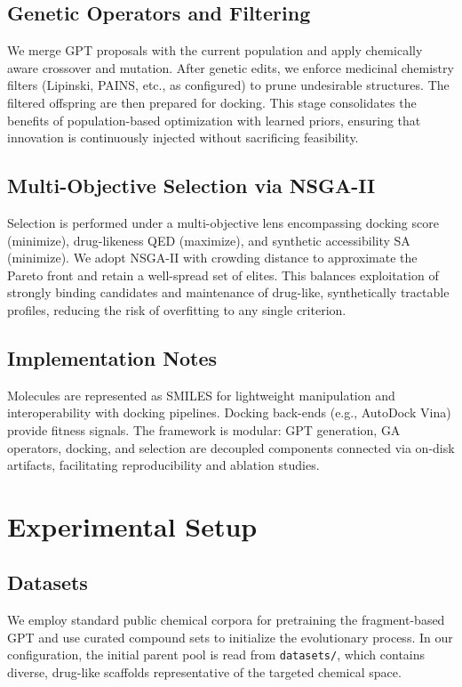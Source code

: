 \documentclass[lettersize,journal]{IEEEtran}
\begin{document}
\subsection{Genetic Operators and Filtering}
We merge GPT proposals with the current population and apply chemically aware crossover and mutation. After genetic edits, we enforce medicinal chemistry filters (Lipinski, PAINS, etc., as configured) to prune undesirable structures. The filtered offspring are then prepared for docking. This stage consolidates the benefits of population-based optimization with learned priors, ensuring that innovation is continuously injected without sacrificing feasibility.

\subsection{Multi-Objective Selection via NSGA-II}
Selection is performed under a multi-objective lens encompassing docking score (minimize), drug-likeness QED (maximize), and synthetic accessibility SA (minimize). We adopt NSGA-II with crowding distance to approximate the Pareto front and retain a well-spread set of elites. This balances exploitation of strongly binding candidates and maintenance of drug-like, synthetically tractable profiles, reducing the risk of overfitting to any single criterion.

\subsection{Implementation Notes}
Molecules are represented as SMILES for lightweight manipulation and interoperability with docking pipelines. Docking back-ends (e.g., AutoDock Vina) provide fitness signals. The framework is modular: GPT generation, GA operators, docking, and selection are decoupled components connected via on-disk artifacts, facilitating reproducibility and ablation studies.


\section{Experimental Setup}
\subsection{Datasets}
We employ standard public chemical corpora for pretraining the fragment-based GPT and use curated compound sets to initialize the evolutionary process. In our configuration, the initial parent pool is read from \texttt{datasets/}, which contains diverse, drug-like scaffolds representative of the targeted chemical space.
\end{document}

